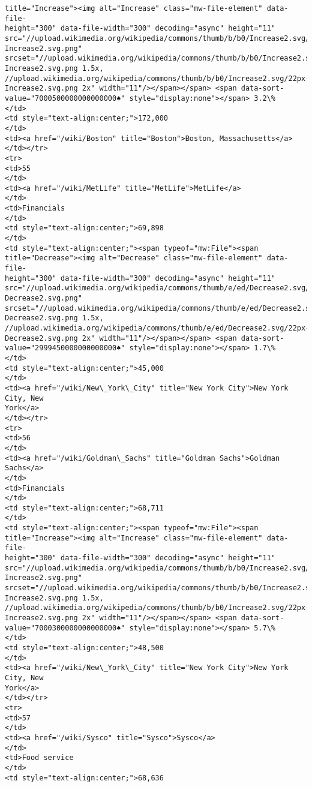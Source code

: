 \documentclass[11pt]{article}
\begin{document}
\begin{Verbatim}[commandchars=\\\{\}]
title="Increase"><img alt="Increase" class="mw-file-element" data-file-
height="300" data-file-width="300" decoding="async" height="11"
src="//upload.wikimedia.org/wikipedia/commons/thumb/b/b0/Increase2.svg/11px-
Increase2.svg.png"
srcset="//upload.wikimedia.org/wikipedia/commons/thumb/b/b0/Increase2.svg/17px-
Increase2.svg.png 1.5x,
//upload.wikimedia.org/wikipedia/commons/thumb/b/b0/Increase2.svg/22px-
Increase2.svg.png 2x" width="11"/></span></span> <span data-sort-
value="7000500000000000000♠" style="display:none"></span> 3.2\%
</td>
<td style="text-align:center;">172,000
</td>
<td><a href="/wiki/Boston" title="Boston">Boston, Massachusetts</a>
</td></tr>
<tr>
<td>55
</td>
<td><a href="/wiki/MetLife" title="MetLife">MetLife</a>
</td>
<td>Financials
</td>
<td style="text-align:center;">69,898
</td>
<td style="text-align:center;"><span typeof="mw:File"><span
title="Decrease"><img alt="Decrease" class="mw-file-element" data-file-
height="300" data-file-width="300" decoding="async" height="11"
src="//upload.wikimedia.org/wikipedia/commons/thumb/e/ed/Decrease2.svg/11px-
Decrease2.svg.png"
srcset="//upload.wikimedia.org/wikipedia/commons/thumb/e/ed/Decrease2.svg/17px-
Decrease2.svg.png 1.5x,
//upload.wikimedia.org/wikipedia/commons/thumb/e/ed/Decrease2.svg/22px-
Decrease2.svg.png 2x" width="11"/></span></span> <span data-sort-
value="2999450000000000000♠" style="display:none"></span> 1.7\%
</td>
<td style="text-align:center;">45,000
</td>
<td><a href="/wiki/New\_York\_City" title="New York City">New York City, New
York</a>
</td></tr>
<tr>
<td>56
</td>
<td><a href="/wiki/Goldman\_Sachs" title="Goldman Sachs">Goldman Sachs</a>
</td>
<td>Financials
</td>
<td style="text-align:center;">68,711
</td>
<td style="text-align:center;"><span typeof="mw:File"><span
title="Increase"><img alt="Increase" class="mw-file-element" data-file-
height="300" data-file-width="300" decoding="async" height="11"
src="//upload.wikimedia.org/wikipedia/commons/thumb/b/b0/Increase2.svg/11px-
Increase2.svg.png"
srcset="//upload.wikimedia.org/wikipedia/commons/thumb/b/b0/Increase2.svg/17px-
Increase2.svg.png 1.5x,
//upload.wikimedia.org/wikipedia/commons/thumb/b/b0/Increase2.svg/22px-
Increase2.svg.png 2x" width="11"/></span></span> <span data-sort-
value="7000300000000000000♠" style="display:none"></span> 5.7\%
</td>
<td style="text-align:center;">48,500
</td>
<td><a href="/wiki/New\_York\_City" title="New York City">New York City, New
York</a>
</td></tr>
<tr>
<td>57
</td>
<td><a href="/wiki/Sysco" title="Sysco">Sysco</a>
</td>
<td>Food service
</td>
<td style="text-align:center;">68,636

\end{Verbatim}
\end{document}
